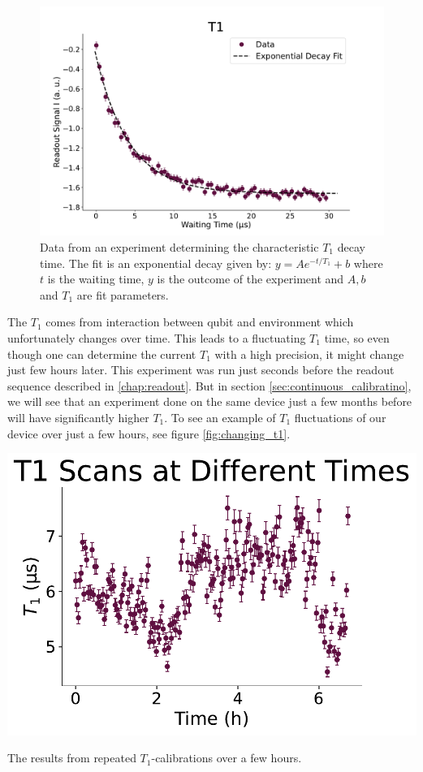 \begin{figure}
    \centering
    \includegraphics[]{Calibrations/Figures/T1.pdf}
    \caption{Data from an experiment determining the characteristic $T_1$ decay time. The fit is an exponential decay given by: $y = A e^{-t / T_1} + b$ where $t$ is the waiting time, $y$ is the outcome of the experiment and $A, b$ and $T_1$ are fit parameters.}
    \label{fig:calibration_T_1_decay}
\end{figure}

The $T_1$ comes from interaction between qubit and environment which unfortunately changes over time. This leads to a fluctuating $T_1$ time, so even though one can determine the current $T_1$ with a high precision, it might change just few hours later. This experiment was run just seconds before the readout sequence described in \ref{chap:readout}. But in section \ref{sec:continuous_calibratino}, we will see that an experiment done on the same device just a few months before will have significantly higher $T_1$. To see an example of $T_1$ fluctuations of our device over just a few hours, see figure \ref{fig:changing_t1}.
\begin{marginfigure}[-5 cm]
    \centering
    \includegraphics[]{Calibrations/Figures/T1 Scans at Different Times.pdf}
    \caption{The results from repeated $T_1$-calibrations over a few hours. }
    \label{fig:changing_t1}
\end{marginfigure}

